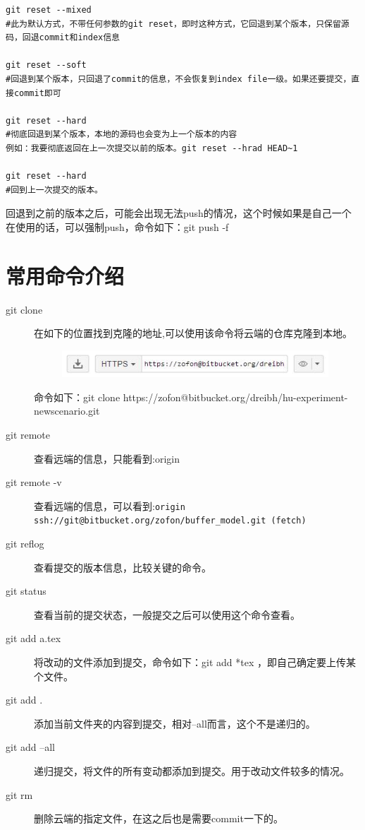\documentclass[a4paper,12pt]{ctexbook}
\begin{document}
\begin{flushleft}
\begin{verbatim}
git reset --mixed
#此为默认方式，不带任何参数的git reset，即时这种方式，它回退到某个版本，只保留源码，回退commit和index信息

git reset --soft
#回退到某个版本，只回退了commit的信息，不会恢复到index file一级。如果还要提交，直接commit即可

git reset --hard
#彻底回退到某个版本，本地的源码也会变为上一个版本的内容
例如：我要彻底返回在上一次提交以前的版本。git reset --hrad HEAD~1

git reset --hard
#回到上一次提交的版本。
\end{verbatim}
回退到之前的版本之后，可能会出现无法push的情况，这个时候如果是自己一个在使用的话，可以强制push，命令如下：git push -f

\section{常用命令介绍}
\begin{description}
  \item[git clone] 在如下的位置找到克隆的地址,可以使用该命令将云端的仓库克隆到本地。
        \begin{figure}[H]
        \centering
        \includegraphics[width=10cm]{figures/clone_address.jpg}
        \end{figure}
        命令如下：git clone https://zofon@bitbucket.org/dreibh/hu-experiment-newscenario.git
  \item[git remote] 查看远端的信息，只能看到:origin
  \item[git remote -v] 查看远端的信息，可以看到:\verb|origin  ssh://git@bitbucket.org/zofon/buffer_model.git (fetch)|
  \item[git reflog] 查看提交的版本信息，比较关键的命令。
  \item[git status] 查看当前的提交状态，一般提交之后可以使用这个命令查看。

  \item[git add a.tex] 将改动的文件添加到提交，命令如下：git add *tex ，即自己确定要上传某个文件。
  \item[git add .] 添加当前文件夹的内容到提交，相对--all而言，这个不是递归的。
  \item[git add --all] 递归提交，将文件的所有变动都添加到提交。用于改动文件较多的情况。

  \item[git rm] 删除云端的指定文件，在这之后也是需要commit一下的。


\end{description}
\end{flushleft}
\end{document}
